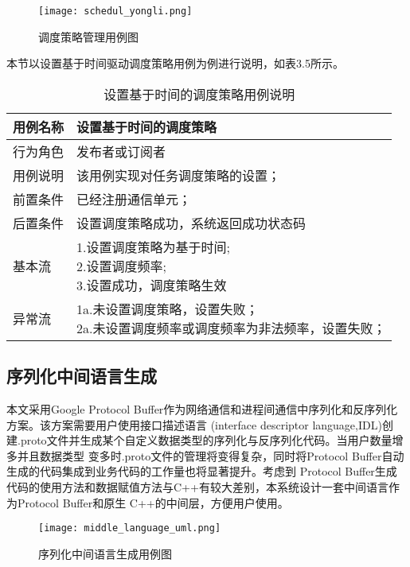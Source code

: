 \begin{figure}[H]
  \centering
  \texttt{[image: schedul\_yongli.png]}
  \caption{调度策略管理用例图}
  \label{schedul_yongli}
\end{figure}

本节以设置基于时间驱动调度策略用例为例进行说明，如表3.5所示。

\begin{table}[H]
  \centering\small
  \renewcommand\arraystretch{1.2}
  \caption{设置基于时间的调度策略用例说明}
  \label{tab:exampletable}
  \begin{tabular}{ll}
    \toprule
    \multicolumn{1}{l}{用例名称} & \multicolumn{1}{l}{设置基于时间的调度策略}  \\
    \midrule
    行为角色 & 发布者或订阅者\\
    用例说明 & 该用例实现对任务调度策略的设置；\\
    前置条件 & 已经注册通信单元；\\
    后置条件 & 设置调度策略成功，系统返回成功状态码\\
    基本流   & \makecell[l]{1.设置调度策略为基于时间;\\2.设置调度频率;\\3.设置成功，调度策略生效}\\
    异常流   & \makecell[l]{1a.未设置调度策略，设置失败；\\2a.未设置调度频率或调度频率为非法频率，设置失败；}\\
    \bottomrule
  \end{tabular}
\end{table}

\subsection{序列化中间语言生成}
本文采用Google Protocol Buffer作为网络通信和进程间通信中序列化和反序列化方案。该方案需要用户使用接口描述语言
(interface descriptor language,IDL)创建.proto文件并生成某个自定义数据类型的序列化与反序列化代码。当用户数量增多并且数据类型
变多时.proto文件的管理将变得复杂，同时将Protocol Buffer自动生成的代码集成到业务代码的工作量也将显著提升。考虑到
Protocol Buffer生成代码的使用方法和数据赋值方法与C++有较大差别，本系统设计一套中间语言作为Protocol Buffer和原生
C++的中间层，方便用户使用。

\begin{figure}[H]
  \centering
  \texttt{[image: middle\_language\_uml.png]}
  \caption{序列化中间语言生成用例图}
  \label{middle_language_uml}
\end{figure}

